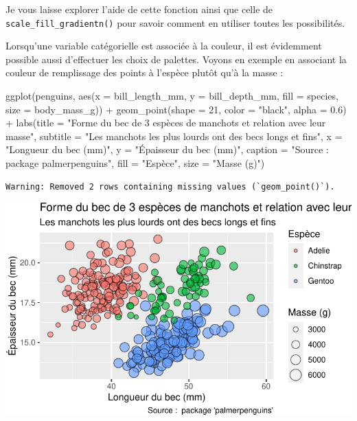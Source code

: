 \documentclass[
  a4paper,
  DIV=11,
  numbers=noendperiod,
  oneside]{scrreprt}
\newenvironment{Shaded}{}{}
\newcommand{\AttributeTok}[1]{\textcolor[rgb]{0.84,0.23,0.29}{#1}}
\newcommand{\DecValTok}[1]{\textcolor[rgb]{0.00,0.36,0.77}{#1}}
\newcommand{\FloatTok}[1]{\textcolor[rgb]{0.00,0.36,0.77}{#1}}
\newcommand{\FunctionTok}[1]{\textcolor[rgb]{0.44,0.26,0.76}{#1}}
\newcommand{\NormalTok}[1]{\textcolor[rgb]{0.14,0.16,0.18}{#1}}
\newcommand{\SpecialCharTok}[1]{\textcolor[rgb]{0.00,0.36,0.77}{#1}}
\newcommand{\StringTok}[1]{\textcolor[rgb]{0.01,0.18,0.38}{#1}}
\begin{document}
Je vous laisse explorer l'aide de cette fonction ainsi que celle de
\texttt{scale\_fill\_gradientn()} pour savoir comment en utiliser toutes
les possibilités.

Lorsqu'une variable catégorielle est associée à la couleur, il est
évidemment possible aussi d'effectuer les choix de palettes. Voyons en
exemple en associant la couleur de remplissage des points à l'espèce
plutôt qu'à la masse :

\begin{Shaded}
\begin{Highlighting}[]
\FunctionTok{ggplot}\NormalTok{(penguins, }\FunctionTok{aes}\NormalTok{(}\AttributeTok{x =}\NormalTok{ bill\_length\_mm, }\AttributeTok{y =}\NormalTok{ bill\_depth\_mm,}
                     \AttributeTok{fill =}\NormalTok{ species, }\AttributeTok{size =}\NormalTok{ body\_mass\_g)) }\SpecialCharTok{+}
  \FunctionTok{geom\_point}\NormalTok{(}\AttributeTok{shape =} \DecValTok{21}\NormalTok{, }\AttributeTok{color =} \StringTok{"black"}\NormalTok{, }\AttributeTok{alpha =} \FloatTok{0.6}\NormalTok{) }\SpecialCharTok{+}
  \FunctionTok{labs}\NormalTok{(}\AttributeTok{title =} \StringTok{"Forme du bec de 3 espèces de manchots et relation avec leur masse"}\NormalTok{,}
       \AttributeTok{subtitle =} \StringTok{"Les manchots les plus lourds ont des becs longs et fins"}\NormalTok{,}
       \AttributeTok{x =} \StringTok{"Longueur du bec (mm)"}\NormalTok{,}
       \AttributeTok{y =} \StringTok{"Épaisseur du bec (mm)"}\NormalTok{,}
       \AttributeTok{caption =} \StringTok{"Source :  package \textquotesingle{}palmerpenguins\textquotesingle{}"}\NormalTok{,}
       \AttributeTok{fill =} \StringTok{"Espèce"}\NormalTok{,}
       \AttributeTok{size =} \StringTok{"Masse (g)"}\NormalTok{)}
\end{Highlighting}
\end{Shaded}

\begin{verbatim}
Warning: Removed 2 rows containing missing values (`geom_point()`).
\end{verbatim}

\includegraphics{03-visualization_files/figure-pdf/unnamed-chunk-98-1.pdf}
\end{document}
